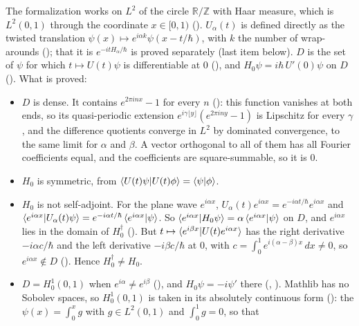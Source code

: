 \documentclass[11pt]{article}
\begin{document}
\begin{itemize}
  The formalization works on $L^2$ of the circle $\mathbb{R}/\mathbb{Z}$ with Haar measure,
  which is $L^2(0,1)$ through the coordinate $x \in [0,1)$ (). $U_\alpha(t)$ is
  defined directly as the twisted translation $\psi(x) \mapsto e^{i\alpha k}\psi(x - t/\hbar)$,
  with $k$ the number of wrap-arounds (); that it is
  $e^{-itH_\alpha/\hbar}$ is proved separately (last item below). $D$ is the set of $\psi$ for which
  $t \mapsto U(t)\psi$ is differentiable at $0$ (), and
  $H_0\psi = i\hbar\,U'(0)\psi$ on $D$ (). What is proved:
  \begin{itemize}
  \item $D$ is dense. It contains $e^{2\pi inx} - 1$ for every $n$
    (): this function vanishes at both ends, so
    its quasi-periodic extension $e^{i\gamma\lfloor y\rfloor}(e^{2\pi iny} - 1)$ is Lipschitz
    for every $\gamma$, and the difference quotients converge in $L^2$ by dominated convergence,
    to the same limit for $\alpha$ and $\beta$. A vector orthogonal to all of them has all
    Fourier coefficients equal, and the coefficients are square-summable, so it is $0$.
  \item $H_0$ is symmetric, from $\braket{U(t)\psi|U(t)\phi} = \braket{\psi|\phi}$.
  \item $H_0$ is not self-adjoint. For the plane wave $e^{i\alpha x}$,
    $U_\alpha(t)e^{i\alpha x} = e^{-i\alpha t/\hbar}e^{i\alpha x}$ and
    $\braket{e^{i\alpha x}|U_\alpha(t)\psi} = e^{-i\alpha t/\hbar}\braket{e^{i\alpha x}|\psi}$.
    So $\braket{e^{i\alpha x}|H_0\psi} = \alpha\braket{e^{i\alpha x}|\psi}$ on $D$, and
    $e^{i\alpha x}$ lies in the domain of $H_0^\dagger$ (). But
    $t \mapsto \braket{e^{i\beta x}|U(t)e^{i\alpha x}}$ has the right derivative
    $-i\alpha c/\hbar$ and the left derivative $-i\beta c/\hbar$ at $0$, with
    $c = \int_0^1 e^{i(\alpha-\beta)x}\,dx \ne 0$, so $e^{i\alpha x} \notin D$
    (). Hence $H_0^\dagger \ne H_0$.
  \item $D = H^1_0(0,1)$ when $e^{i\alpha} \ne e^{i\beta}$ (), and
    $H_0\psi = -i\psi'$ there (,
    ). Mathlib has no Sobolev spaces, so
    $H^1_0(0,1)$ is taken in its absolutely continuous form (): the
    $\psi(x) = \int_0^x g$ with $g \in L^2(0,1)$ and $\int_0^1 g = 0$, so that

\end{itemize}
\end{itemize}
\end{document}
